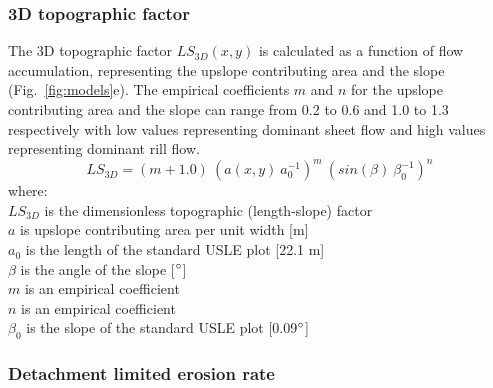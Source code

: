 \documentclass[gmd, manuscript]{copernicus}
\begin{document}
\subsubsection{3D topographic factor}
%
The 3D topographic factor $LS_{3D}(x,y)$
is calculated as a function of flow accumulation,
representing the upslope contributing area
and the slope 
(Fig.~\ref{fig:models}e). 
%
The empirical coefficients $m$ and $n$
for the upslope contributing area 
and the slope
can range from 0.2 to 0.6
and 1.0 to 1.3 respectively
with low values representing dominant sheet flow
and high values representing dominant rill flow.
%
\begin{equation}
\label{eq:ls_factor}
{LS_{3D} = (m+1.0) ~ (a(x,y) ~ a_0^{-1})^{m} ~ (sin(\beta) ~ \beta_0^{-1})^{n}}
\end{equation}
%
{\small
\noindent
where: \\
\noindent
\hspace*{0.5em} $LS_{3D}$ is the dimensionless topographic (length-slope) factor\\
\hspace*{0.5em} $a$ is upslope contributing area per unit width [\unit{m}]\\
\hspace*{0.5em} $a_0$ is the length of the standard USLE plot [22.1 \unit{m}]\\
\hspace*{0.5em} $\beta$ is the angle of the slope [$^{\circ}$]\\
\hspace*{0.5em} $m$ is an empirical coefficient\\
\hspace*{0.5em} $n$ is an empirical coefficient\\
\hspace*{0.5em} $\beta_0$ is the slope of the standard USLE plot [0.09$^{\circ}$]\\
}


\subsubsection{Detachment limited erosion rate}
\end{document}
